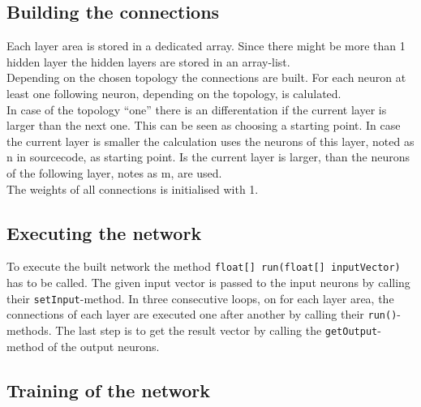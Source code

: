 \subsection{Building the connections}
Each layer area is stored in a dedicated array. Since there might be more than 1 hidden layer the hidden layers are stored in an array-list.\\
Depending on the chosen topology the connections are built. For each neuron at least one following neuron, depending on the topology, is calulated.\\
In case of the topology ``one'' 
there is an differentation if the current layer is larger than the next one. This can be seen as choosing a starting point. In case the current layer is smaller the calculation uses the neurons of this layer, noted as n in sourcecode, as starting point. Is the current layer is larger, than the neurons of the following layer, notes as m, are used.\\
The weights of all connections is initialised with 1.


\subsection{Executing the network}
To execute the built network the method \texttt{float[] run(float[] inputVector)} has to be called. The given input vector is passed to the input neurons by calling their \texttt{setInput}-method. In three consecutive loops, on for each layer area, the connections of each layer are executed one after another by calling their \texttt{run()}-methods. The last step is to get the result vector by calling the \texttt{getOutput}-method of the output neurons.

\subsection{Training of the network}

